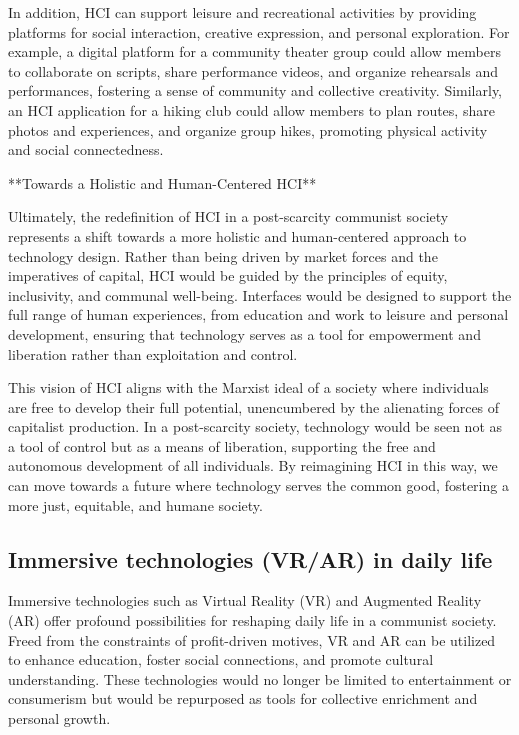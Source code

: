 In addition, HCI can support leisure and recreational activities by providing platforms for social interaction, creative expression, and personal exploration. For example, a digital platform for a community theater group could allow members to collaborate on scripts, share performance videos, and organize rehearsals and performances, fostering a sense of community and collective creativity. Similarly, an HCI application for a hiking club could allow members to plan routes, share photos and experiences, and organize group hikes, promoting physical activity and social connectedness.

**Towards a Holistic and Human-Centered HCI**

Ultimately, the redefinition of HCI in a post-scarcity communist society represents a shift towards a more holistic and human-centered approach to technology design. Rather than being driven by market forces and the imperatives of capital, HCI would be guided by the principles of equity, inclusivity, and communal well-being. Interfaces would be designed to support the full range of human experiences, from education and work to leisure and personal development, ensuring that technology serves as a tool for empowerment and liberation rather than exploitation and control.

This vision of HCI aligns with the Marxist ideal of a society where individuals are free to develop their full potential, unencumbered by the alienating forces of capitalist production. In a post-scarcity society, technology would be seen not as a tool of control but as a means of liberation, supporting the free and autonomous development of all individuals. By reimagining HCI in this way, we can move towards a future where technology serves the common good, fostering a more just, equitable, and humane society.

\subsection{Immersive technologies (VR/AR) in daily life}

Immersive technologies such as Virtual Reality (VR) and Augmented Reality (AR) offer profound possibilities for reshaping daily life in a communist society. Freed from the constraints of profit-driven motives, VR and AR can be utilized to enhance education, foster social connections, and promote cultural understanding. These technologies would no longer be limited to entertainment or consumerism but would be repurposed as tools for collective enrichment and personal growth.

